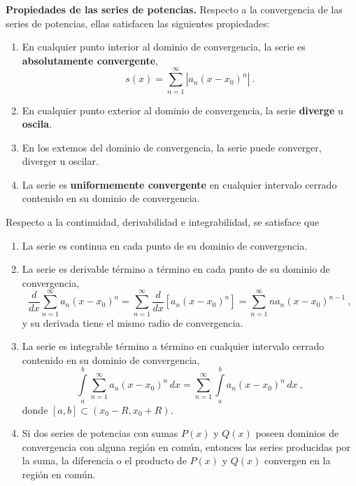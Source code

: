 \begin{propiedad}{\textbf{Propiedades de las series de potencias.}}
    Respecto a la convergencia de las series de potencias, ellas satisfacen las siguientes propiedades:
    \begin{enumerate}[series=potencias]
        \item En cualquier punto interior al dominio de convergencia, la serie es \textbf{absolutamente convergente},
        \begin{equation*}
            s(x) = \sum_{n=1}^\infty |a_n (x-x_0)^n| \ .
        \end{equation*}
        \item En cualquier punto exterior al dominio de convergencia, la serie \textbf{diverge} u \textbf{oscila}.
        \item En los extemos del dominio de convergencia, la serie puede converger, diverger u oscilar.
        \item La serie es \textbf{uniformemente convergente} en cualquier intervalo cerrado contenido en su dominio de convergencia.
    \end{enumerate}

    Respecto a la continuidad, derivabilidad e integrabilidad, se satisface que 
    \begin{enumerate}[resume, series=potencias]
        \item La serie es continua en cada punto de su dominio de convergencia.
        \item La serie es derivable término a término en cada punto de su dominio de convergencia,
        \begin{equation*}
            \frac{d}{dx} \sum_{n=1}^\infty a_n(x-x_0)^n = \sum_{n=1}^\infty \frac{d}{dx} [a_n (x-x_0)^n] = \sum_{n=1}^\infty n a_n(x-x_0)^{n-1} \ ,
        \end{equation*}
        y su derivada tiene el mismo radio de convergencia.
        \item La serie es integrable término a término en cualquier intervalo cerrado contenido en su dominio de convergencia,
        \begin{equation*}
            \int\limits_a^b \sum_{n=1}^\infty a_n(x-x_0)^n \, dx = \sum_{n=1}^\infty \int\limits_a^b a_n(x-x_0)^n \, dx \ ,
        \end{equation*}
        donde $[a,b] \subset (x_0-R, x_0+R)$.
        \item Si dos series de potencias con sumas $P(x)$ y $Q(x)$ poseen dominios de convergencia con alguna región en común, entonces las series producidas por la suma, la diferencia o el producto de $P(x)$ y $Q(x)$ convergen en la región en común.
    \end{enumerate}
\end{propiedad}


